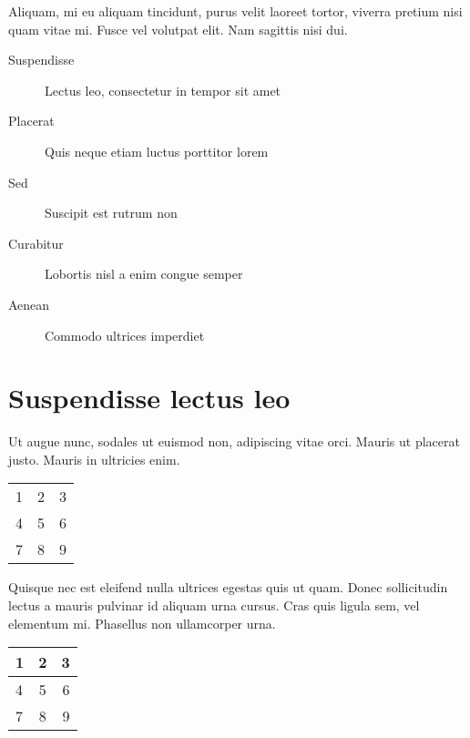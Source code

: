 \documentclass{article}
\begin{document}
Aliquam, mi eu aliquam tincidunt, purus velit laoreet tortor, viverra pretium
nisi quam vitae mi. Fusce vel volutpat elit. Nam sagittis nisi dui.

\begin{description}
  \item[Suspendisse] Lectus leo, consectetur in tempor sit amet
  \item[Placerat] Quis neque etiam luctus porttitor lorem
  \item[Sed] Suscipit est rutrum non
  \item[Curabitur] Lobortis nisl a enim congue semper
  \item[Aenean] Commodo ultrices imperdiet
\end{description}

\section{Suspendisse lectus leo}

Ut augue nunc, sodales ut euismod non, adipiscing vitae orci. Mauris ut placerat
justo. Mauris in ultricies enim.

\begin{tabular}{ l c r }
  1 & 2 & 3 \\
  4 & 5 & 6 \\
  7 & 8 & 9 \\
\end{tabular}

Quisque nec est eleifend nulla ultrices
egestas quis ut quam. Donec sollicitudin lectus a mauris pulvinar id aliquam
urna cursus. Cras quis ligula sem, vel elementum mi. Phasellus non ullamcorper
urna.

\begin{tabular}{|l|c|r|}
  \hline
  1 & 2 & 3 \\ \hline
  4 & 5 & 6 \\ \hline
  7 & 8 & 9 \\ \hline
\end{tabular}
\end{document}
